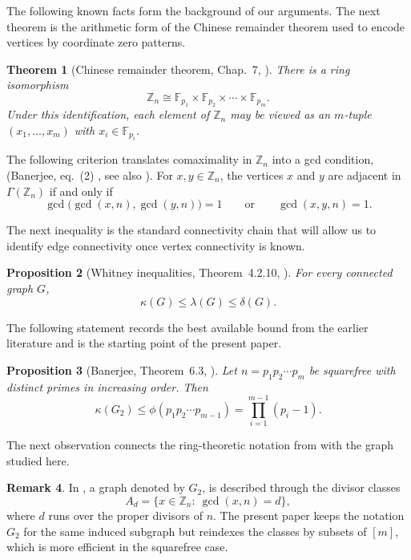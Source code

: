 \documentclass[12pt]{article}
\newtheorem{theorem}{Theorem}[section]
\newtheorem{proposition}[theorem]{Proposition}
\theoremstyle{definition}
\newtheorem{remark}[theorem]{Remark}
\newcommand{\F}{\mathbb F}
\begin{document}
	The following known facts form the background of our arguments. The next theorem is the arithmetic form of the Chinese remainder theorem used to encode vertices by coordinate zero patterns.	
	\begin{theorem}[Chinese remainder theorem, Chap.~7, \cite{DummitFoote2004}]\label{thm:CRT}
		There is a ring isomorphism
		$$
		\mathbb Z_n\cong \F_{p_1}\times \F_{p_2}\times\cdots\times \F_{p_m}.
		$$
		Under this identification, each element of $\mathbb Z_n$ may be viewed as an $m$-tuple $(x_1,\dots,x_m)$ with $x_i\in \F_{p_i}$.
	\end{theorem}
	
	\medskip
	 The following criterion translates comaximality in $\mathbb Z_n$ into a gcd condition, (Banerjee, eq.~(2) \cite{Banerjee2022}, see also \cite{afkhami}). For $x,y\in \mathbb Z_n$, the vertices $x$ and $y$ are adjacent in $\Gamma(\mathbb Z_n)$ if and only if
		\begin{equation}\label{prop:gcdcriterion}
		\gcd\big(\gcd(x,n),\gcd(y,n)\big)=1 \qquad\text{or}\qquad \gcd(x,y,n)=1.
		\end{equation} 
	
	\medskip
	 The next inequality is the standard connectivity chain that will allow us to identify edge connectivity once vertex connectivity is known.	
	\begin{proposition}[Whitney inequalities, Theorem~4.2.10, \cite{West2001}]\label{prop:Whitney}
		For every connected graph $G$,
		$$
		\kappa(G)\leq \lambda(G)\leq \delta(G).
		$$
	\end{proposition}
	
	\medskip
	 The following statement records the best available bound from the earlier literature and is the starting point of the present paper.	
	\begin{proposition}[Banerjee, Theorem~6.3, \cite{Banerjee2022}]\label{prop:BanerjeeUpper}
		Let $n=p_1p_2\cdots p_m$ be squarefree with distinct primes in increasing order. Then
		$$
		\kappa(G_2)\leq \phi(p_1p_2\cdots p_{m-1})=\prod_{i=1}^{m-1}(p_i-1).
		$$
	\end{proposition}
	
	\medskip
	 The next observation connects the ring-theoretic notation from \cite{Banerjee2022,afkhami} with the graph studied here.
	
	\begin{remark}\label{remark}
		In \cite{Banerjee2022,afkhami}, a graph denoted by $G_2$, is described through the divisor classes
		$$
		A_d=\{x\in \mathbb Z_n:\ \gcd(x,n)=d\},
		$$
		where $d$ runs over the proper divisors of $n$. The present paper keeps the notation $G_2$ for the same induced subgraph but reindexes the classes by subsets of $[m]$, which is more efficient in the squarefree case.
	\end{remark}
	
\end{document}
